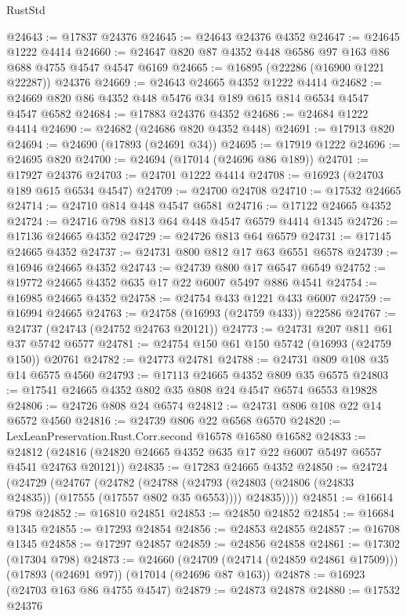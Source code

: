 \begin{lexlean}{RustStd}
\begin{coremodule}
{\begin{coremodule}
{{{{{{{{{{{{{{{{{{{{{{{{{{{{{{{{{{{{{{{{{{{{{{{{{{{{{{{@24643 := @17837 @24376
@24645 := @24643 @24376 @4352
@24647 := @24645 @1222 @4414
@24660 := @24647 @820 @87 @4352 @448 @6586 @97 @163 @86 @688 @4755 @4547 @4547 @6169
@24665 := @16895 (@22286 (@16900 @1221 @22287)) @24376
@24669 := @24643 @24665 @4352 @1222 @4414
@24682 := @24669 @820 @86 @4352 @448 @5476 @34 @189 @615 @814 @6534 @4547 @4547 @6582
@24684 := @17883 @24376 @4352
@24686 := @24684 @1222 @4414
@24690 := @24682 (@24686 @820 @4352 @448)
@24691 := @17913 @820
@24694 := @24690 (@17893 (@24691 @34))
@24695 := @17919 @1222
@24696 := @24695 @820
@24700 := @24694 (@17014 (@24696 @86 @189))
@24701 := @17927 @24376
@24703 := @24701 @1222 @4414
@24708 := @16923 (@24703 @189 @615 @6534 @4547)
@24709 := @24700 @24708
@24710 := @17532 @24665
@24714 := @24710 @814 @448 @4547 @6581
@24716 := @17122 @24665 @4352
@24724 := @24716 @798 @813 @64 @448 @4547 @6579 @4414 @1345
@24726 := @17136 @24665 @4352
@24729 := @24726 @813 @64 @6579
@24731 := @17145 @24665 @4352
@24737 := @24731 @800 @812 @17 @63 @6551 @6578
@24739 := @16946 @24665 @4352
@24743 := @24739 @800 @17 @6547 @6549
@24752 := @19772 @24665 @4352 @635 @17 @22 @6007 @5497 @886 @4541
@24754 := @16985 @24665 @4352
@24758 := @24754 @433 @1221 @433 @6007
@24759 := @16994 @24665
@24763 := @24758 (@16993 (@24759 @433)) @22586
@24767 := @24737 (@24743 (@24752 @24763 @20121))
@24773 := @24731 @207 @811 @61 @37 @5742 @6577
@24781 := @24754 @150 @61 @150 @5742 (@16993 (@24759 @150)) @20761
@24782 := @24773 @24781
@24788 := @24731 @809 @108 @35 @14 @6575 @4560
@24793 := @17113 @24665 @4352 @809 @35 @6575
@24803 := @17541 @24665 @4352 @802 @35 @808 @24 @4547 @6574 @6553 @19828
@24806 := @24726 @808 @24 @6574
@24812 := @24731 @806 @108 @22 @14 @6572 @4560
@24816 := @24739 @806 @22 @6568 @6570
@24820 := LexLeanPreservation.Rust.Corr.second @16578 @16580 @16582
@24833 := @24812 (@24816 (@24820 @24665 @4352 @635 @17 @22 @6007 @5497 @6557 @4541 @24763 @20121))
@24835 := @17283 @24665 @4352
@24850 := @24724
    (@24729
      (@24767
        (@24782
          (@24788
            (@24793 (@24803 (@24806 (@24833 @24835)) (@17555 (@17557 @802 @35 @6553))))
            @24835))))
@24851 := @16614 @798
@24852 := @16810 @24851
@24853 := @24850 @24852
@24854 := @16684 @1345
@24855 := @17293 @24854
@24856 := @24853 @24855
@24857 := @16708 @1345
@24858 := @17297 @24857
@24859 := @24856 @24858
@24861 := @17302 (@17304 @798)
@24873 := @24660
    (@24709 (@24714 (@24859 @24861 @17509)))
    (@17893 (@24691 @97))
    (@17014 (@24696 @87 @163))
@24878 := @16923 (@24703 @163 @86 @4755 @4547)
@24879 := @24873 @24878
@24880 := @17532 @24376
}}}}}}}}}}}}}}}}}}}}}}}}}}}}}}}}}}}}}}}}}}}}}}}}}}}}}}}
\end{coremodule}}
\end{coremodule}
\end{lexlean}
